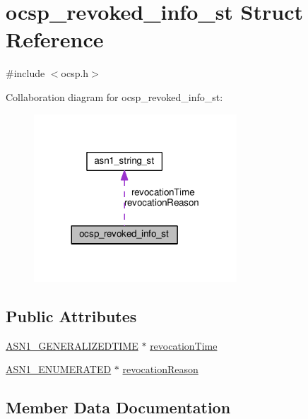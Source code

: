 \hypertarget{structocsp__revoked__info__st}{}\section{ocsp\+\_\+revoked\+\_\+info\+\_\+st Struct Reference}
\label{structocsp__revoked__info__st}


{\ttfamily \#include $<$ocsp.\+h$>$}



Collaboration diagram for ocsp\+\_\+revoked\+\_\+info\+\_\+st\+:
\nopagebreak
\begin{figure}[H]
\begin{center}
\leavevmode
\includegraphics[width=215pt]{structocsp__revoked__info__st__coll__graph}
\end{center}
\end{figure}
\subsection*{Public Attributes}
\begin{DoxyCompactItemize}
\item 
\hyperlink{ossl__typ_8h_abd19ea5b527807ce3a516e6a41440f84}{A\+S\+N1\+\_\+\+G\+E\+N\+E\+R\+A\+L\+I\+Z\+E\+D\+T\+I\+ME} $\ast$ \hyperlink{structocsp__revoked__info__st_af95cc4676f07ed0d45dfbe2c4b851902}{revocation\+Time}
\item 
\hyperlink{ossl__typ_8h_a4b87b1c33899eb49377f298e8a8b9850}{A\+S\+N1\+\_\+\+E\+N\+U\+M\+E\+R\+A\+T\+ED} $\ast$ \hyperlink{structocsp__revoked__info__st_a07edd6ecff783b2ad3e0ecf143fdddc3}{revocation\+Reason}
\end{DoxyCompactItemize}


\subsection{Member Data Documentation}
